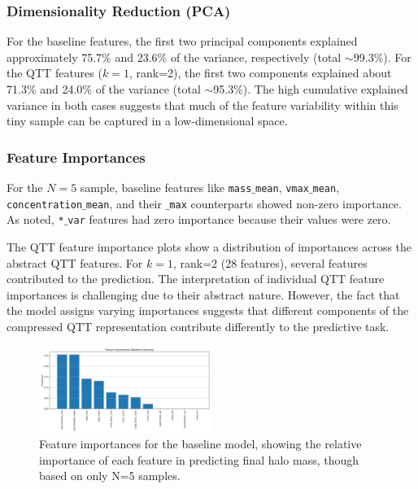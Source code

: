 \documentclass[twocolumn]{aastex631}
\begin{document}
\subsubsection{Dimensionality Reduction (PCA)}
For the baseline features, the first two principal components explained approximately 75.7\% and 23.6\% of the variance, respectively (total $\sim$99.3\%). For the QTT features ($k=1$, rank=2), the first two components explained about 71.3\% and 24.0\% of the variance (total $\sim$95.3\%). The high cumulative explained variance in both cases suggests that much of the feature variability within this tiny sample can be captured in a low-dimensional space.

\subsubsection{Feature Importances}
For the $N=5$ sample, baseline features like \texttt{mass\ensuremath{\_}mean}, \texttt{vmax\ensuremath{\_}mean}, \texttt{concentration\ensuremath{\_}mean}, and their \texttt{\ensuremath{\_}max} counterparts showed non-zero importance. As noted, \texttt{*\ensuremath{\_}var} features had zero importance because their values were zero.

The QTT feature importance plots show a distribution of importances across the abstract QTT features. For $k=1$, rank=2 (28 features), several features contributed to the prediction. The interpretation of individual QTT feature importances is challenging due to their abstract nature. However, the fact that the model assigns varying importances suggests that different components of the compressed QTT representation contribute differently to the predictive task.

\begin{figure}[h!]
    \centering
    \includegraphics[width=0.5\textwidth]{../input_files/plots/feature_importances_baseline_3_20250524-175150.png}
    \caption{Feature importances for the baseline model, showing the relative importance of each feature in predicting final halo mass, though based on only N=5 samples.
}
    \label{fig:feature_importances_baseline}
\end{figure}
\end{document}
